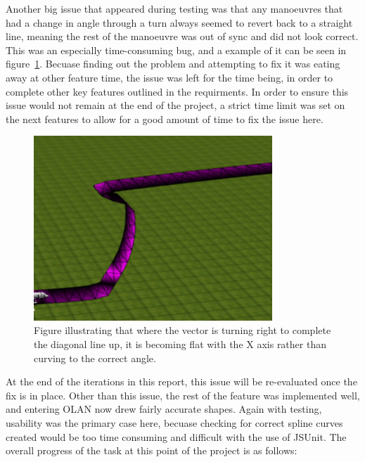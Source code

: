 Another big issue that appeared during testing was that any manoeuvres that had a change in angle through a turn always seemed to revert back to a straight line, meaning the rest of the manoeuvre was out of sync and did not look correct. This was an especially time-consuming bug, and a example of it can be seen in figure~\ref{fig:issue}. Becuase finding out the problem and attempting to fix it was eating away at other feature time, the issue was left for the time being, in order to complete other key features outlined in the requirments. In order to ensure this issue would not remain at the end of the project, a strict time limit was set on the next features to allow for a good amount of time to fix the issue here.

\begin{figure}[h]
  \centering
      \includegraphics[width=0.8\textwidth]{images/issue.png}
  \caption{Figure illustrating that where the vector is turning right to complete the diagonal line up, it is becoming flat with the X axis rather than curving to the correct angle.}
  \label{fig:issue}
\end{figure}

At the end of the iterations in this report, this issue will be re-evaluated once the fix is in place. Other than this issue, the rest of the feature was implemented well, and entering OLAN now drew fairly accurate shapes. Again with testing, usability was the primary case here, becuase checking for correct spline curves created would be too time consuming and difficult with the use of JSUnit. The overall progress of the task at this point of the project is as follows:

